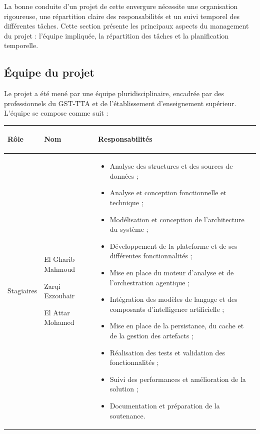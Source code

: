 La bonne conduite d'un projet de cette envergure nécessite une organisation rigoureuse, une répartition claire des responsabilités et un suivi temporel des différentes tâches. Cette section présente les principaux aspects du management du projet : l'équipe impliquée, la répartition des tâches et la planification temporelle.

\subsection{Équipe du projet}

Le projet a été mené par une équipe pluridisciplinaire, encadrée par des professionnels du GST-TTA et de l'établissement d'enseignement supérieur. L'équipe se compose comme suit :
\begin{table}[H]
\centering
\small
\renewcommand{\arraystretch}{1.25}

\begin{tabularx}{\textwidth}{
    >{\bfseries\raggedright\arraybackslash}p{3.3cm}
    >{\raggedright\arraybackslash}p{4.0cm}
    >{\raggedright\arraybackslash}X
}
\toprule
\rowcolor{TableHeader}
\color{white}\textbf{Rôle} &
\color{white}\textbf{Nom} &
\color{white}\textbf{Responsabilités} \\
\midrule

Stagiaires
&
El Gharib Mahmoud\par\medskip
Zarqi  Ezzoubair\par\medskip
El Attar Mohamed
&
\begin{itemize}[leftmargin=*,nosep]
    \item Analyse des structures et des sources de données ;
    \item Analyse et conception fonctionnelle et technique ;
    \item Modélisation et conception de l'architecture du système ;
    \item Développement de la plateforme et de ses différentes fonctionnalités ;
    \item Mise en place du moteur d'analyse et de l'orchestration agentique ;
    \item Intégration des modèles de langage et des composants d'intelligence artificielle ;
    \item Mise en place de la persistance, du cache et de la gestion des artefacts ;
    \item Réalisation des tests et validation des fonctionnalités ;
    \item Suivi des performances et amélioration de la solution ;
    \item Documentation et préparation de la soutenance.
\end{itemize}
\\


\end{tabularx}
\end{table}
